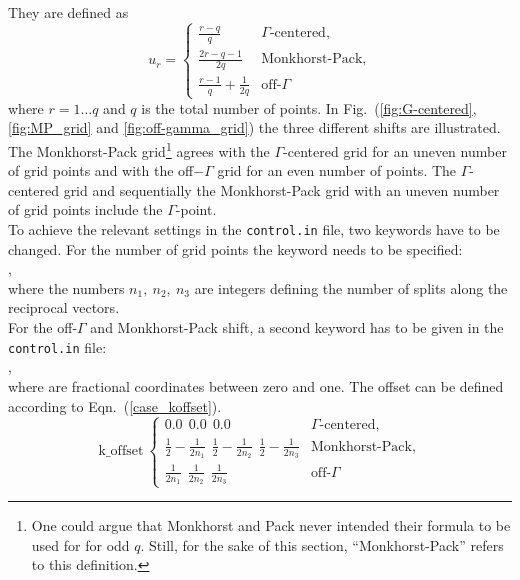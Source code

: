 They are defined as
\begin{equation}
  \label{eqn_K-shift}
  u_{r}=\begin{cases}
\frac{r-q}{q}& \text{$\Gamma$-centered},\\
\frac{2r-q-1}{2q}& \text{Monkhorst-Pack},\\
\frac{r-1}{q}+\frac{1}{2q}& \text{off-$\Gamma$}
\end{cases}
\end{equation}
where $r=1 \dotsc q$ and $q$ is the total number of points. In
Fig.~(\ref{fig:G-centered}, \ref{fig:MP_grid} and \ref{fig:off-gamma_grid})
the three different shifts are illustrated. The Monkhorst-Pack grid\footnote{%
  One could argue that Monkhorst and Pack never intended their formula to be
  used for for odd $q$.  Still, for the sake of this section,
  ``Monkhorst-Pack'' refers to this definition.} %
agrees with the $\Gamma$-centered grid for an uneven number of grid points and
with the off$-\Gamma$ grid for an even number of points. The $\Gamma$-centered
grid and sequentially the Monkhorst-Pack grid with an uneven number of grid
points include the $\Gamma$-point.\\
%
To achieve the relevant settings in the \texttt{control.in} file, two keywords have to be changed. For the number of grid points the keyword  needs to be specified:\\
   ,\\
where the numbers $n_1,~n_2,~n_3$ are integers defining the number of splits along the reciprocal vectors.\\
For the off-$\Gamma$ and Monkhorst-Pack shift, a second keyword has to be given in the \texttt{control.in} file:\\
   ,\\
where  are fractional coordinates between zero and one. The offset can be defined according to Eqn.~(\ref{case_koffset}).
%
\begin{equation}
 \text{k\_offset}~ \begin{cases}
0.0 ~~ 0.0 ~~ 0.0 & \text{$\Gamma$-centered},\\
\frac{1}{2}-\frac{1}{2n_1} ~~ \frac{1}{2}-\frac{1}{2n_2} ~~ \frac{1}{2}-\frac{1}{2n_3} & \text{Monkhorst-Pack},\\
\frac{1}{2n_1} ~~ \frac{1}{2n_2} ~~ \frac{1}{2n_3} & \text{off-$\Gamma$}
\end{cases}
\end{equation}\label{case_koffset}
